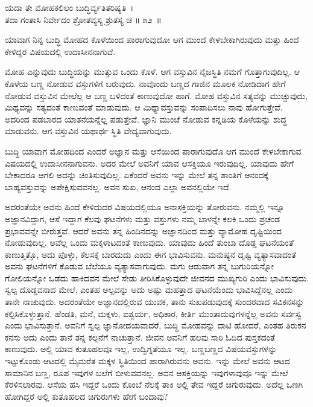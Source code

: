\begin{shloka}
ಯದಾ ತೇ ಮೋಹಕಲಿಲಂ ಬುದ್ಧಿರ್ವ್ಯತಿತರಿಷ್ಯತಿ~।\\ತದಾ ಗಂತಾಸಿ ನಿರ್ವೇದಂ ಶ್ರೋತವ್ಯಸ್ಯ ಶ್ರುತಸ್ಯ ಚ \hfill॥ ೫೨~॥
\end{shloka}

\begin{artha}
ಯಾವಾಗ ನಿನ್ನ ಬುದ್ಧಿ ಮೋಹದ ಕೊಳೆಯಿಂದ ಪಾರಾಗುವುದೋ ಆಗ ಮುಂದೆ ಕೇಳಬೇಕಾಗಿರುವುದು ಮತ್ತು ಹಿಂದೆ ಕೇಳಿದ್ದರ ವಿಷಯದಲ್ಲಿ ಉದಾಸೀನನಾಗುವೆ.
\end{artha}

ಮೋಹ ಎನ್ನುವುದು ಬುದ್ಧಿಯನ್ನು ಮುತ್ತುವ ಒಂದು ಕೊಳೆ. ಆಗ ವಸ್ತುವಿನ ನೈಜಸ್ಥಿತಿ ನಮಗೆ ಗೊತ್ತಾಗುವುದಿಲ್ಲ. ಆ ಕೊಳೆಯ ಬಣ್ಣ ನೋಡುವ ವಸ್ತುಗಳಿಗೆ ಬರುವುದು. ನಾವೊಂದು ಬಣ್ಣದ ಗಾಜಿನ ಮೂಲಕ ನೋಡಿದಾಗ ಹೇಗೆ ನೋಡುವ ವಸ್ತುವಿನ ಮೇಲೆಲ್ಲ ಆ ಬಣ್ಣ ಬಳಿದಂತೆ ಕಾಣುವುದೋ ಹಾಗೆ. ಮೋಹ ವಸ್ತುವಿನ ಸತ್ಯವನ್ನು ಮುಚ್ಚುವುದು, ಮಿಥ್ಯವನ್ನು ಸತ್ಯದಂತೆ ಕಾಣುವಂತೆ ಮಾಡುವುದು. ಆ ಮಿಥ್ಯಾವಸ್ತುವನ್ನು ಸಂಪಾದಿಸಲು ನಾವು ಹೋಗುತ್ತೇವೆ. ಅದರಿಂದ ಪಡಬಾರದ ಯಾತನೆಯನ್ನೆಲ್ಲ ಪಡುತ್ತೇವೆ. ಜ್ಞಾನಿ ಮುಂಚೆ ನೋಡುವ ಕನ್ನಡಿಯ ಕೊಳೆಯನ್ನು ಶುದ್ಧ ಮಾಡುವನು. ಆಗ ವಸ್ತುವಿನ ಯಥಾರ್ಥ ಸ್ಥಿತಿ ವೇದ್ಯವಾಗುವುದು.

ಬುದ್ಧಿ ಯಾವಾಗ ಮೋಹದಿಂದ ಎಂದರೆ ಅಜ್ಞಾನ ಮತ್ತು ಆಸೆಯಿಂದ ಪಾರಾಗುವುದೊ ಆಗ ಮುಂದೆ ಕೇಳಬೇಕಾಗುವ ವಿಷಯದಲ್ಲಿ ಉದಾಸೀನನಾಗುವನು. ಅದರ ಮೇಲೆ ಅವನಿಗೆ ಯಾವ ಆಸಕ್ತಿಯೂ ಇರುವುದಿಲ್ಲ. ಯಾವುದು ಹೇಗೆ ಬೇಕಾದರೂ ಆಗಲಿ ಅದನ್ನು ಚಿಂತಿಸುವುದಿಲ್ಲ. ಏಕೆಂದರೆ ಅವನು ಇನ್ನು ಮೇಲೆ ತನ್ನ ಶಾಂತಿಗೆ ಆನಂದಕ್ಕೆ ಬಾಹ್ಯವಸ್ತುವನ್ನು ಅಪೇಕ್ಷಿಸುವವನಲ್ಲ. ಅವನ ಸುಖ, ಆನಂದ ಎಲ್ಲಾ ಅವನಲ್ಲಿಯೇ ಇದೆ.

ಅದರಂತೆಯೇ ಅವನು ಹಿಂದೆ ಕೇಳಿದುದರ ವಿಷಯದಲ್ಲಿಯೂ ಅನಾಸಕ್ತಿಯನ್ನು ತೋರು\-ವನು. ನಮ್ಮಲ್ಲಿ ಇನ್ನೂ ಅಜ್ಞಾನವಿದ್ದಾಗ, ಆಸೆ ಇದ್ದಾಗ ಕೆಲವು ಘಟನೆಗಳು ಮತ್ತು ವಸ್ತುಗಳು ನಮ್ಮ ಬಾಳನ್ನೇ ಕಲಕಿ ಒಂದು ಪ್ರಚಂಡ ಪ್ರಭಾವವನ್ನೇ ಬೀರುತ್ತವೆ. ಆದರೆ ಅವನು ತನ್ನ ಹಿಂದಿನದನ್ನು ಅಜ್ಞಾನದಿಂದ ಮತ್ತು ವ್ಯಾಮೋಹ ದೃಷ್ಟಿಯಿಂದ ನೋಡುವುದಿಲ್ಲ. ಅವೆಲ್ಲ ಒಂದು ಮಕ್ಕಳಾಟದಂತೆ ಕಾಣುವುದು. ಯಾವುದು ಹಿಂದೆ ತುಂಬಾ ದೊಡ್ಡ ಘಟನೆಯಂತೆ ಕಾಣುತ್ತಿತ್ತೊ, ಅದು ಪೊಳ್ಳು, ಕೆಲಸಕ್ಕೆ ಬಾರದುದು ಎಂದು ಈಗ ಭಾವಿಸುವನು. ಮನುಷ್ಯನ ದೃಷ್ಟಿ ವ್ಯತ್ಯಾಸ\-ವಾದಂತೆ ಅವನು ಘಟನೆಗಳಿಗೆ ಕೊಡುವ ಬೆಲೆಯೂ ವ್ಯತ್ಯಾಸವಾಗುವುದು. ಮಗು ಆಡುವಾಗ ತನ್ನ ಬುಗುರಿಯನ್ನೋ ಗೋಲಿಯನ್ನೋ ಒಡೆದು ಹಾಕಿದವನ ಮೇಲೆ ಸೇಡು ತೀರಿಸಿಕೊಳ್ಳುವುದೇ ಜೀವನದ ಮುಖ್ಯಗುರಿ ಎಂದು ಭಾವಿಸುವುದು. ಸ್ವಲ್ಪ ದೊಡ್ಡವನಾದ ಮೇಲೆ, ಎಂತಹ ಅಲ್ಪವನ್ನು ಅದು ಅಷ್ಟು ಮಹತ್ತಾದ ಘಟನೆಯೆಂದು ಭಾವಿಸಿದ್ದೆನಲ್ಲ ಎಂದು ತಾನೇ ನಾಚುವುದು. ಅದರಂತೆಯೇ ಅಜ್ಞಾನದಲ್ಲಿರುವ ಯುವಕ, ತಾನು ಸುಖಪಡುವುದಕ್ಕೆ ಸುಂದರವಾದ ಸವಿಕನಸನ್ನು ಕಲ್ಪಿಸಿಕೊಳ್ಳುತ್ತಾನೆ. ಹೆಂಡತಿ, ಮನೆ, ಮಕ್ಕಳು, ಐಶ್ವರ್ಯ, ಅಧಿಕಾರ, ಕೀರ್ತಿ ಮುಂತಾದುವುಗಳನ್ನೆಲ್ಲ ಅವನು ಸರ್ವಸ್ವ ಎಂದು ಭಾವಿಸುತ್ತಾನೆ. ಅವನಿಗೆ ಸ್ವಲ್ಪ ಜ್ಞಾನೋದಯವಾದರೆ, ಬುದ್ಧಿ ಮೋಹವನ್ನು ದಾಟಿ ಹೋದರೆ, ಎಂತಹ ತಿರುಕನ ಕನಸು ಅದು ಎಂದು ತಾನೆ ತನ್ನ ಕಲ್ಪನೆಗೆ ನಾಚುತ್ತಾನೆ. ಜೀವನ ಅವನಿಗೆ ಹಲವು ಸಾರಿ ಓದಿದ ಪುಸ್ತಕದಂತೆ ಕಾಣುವುದು. ಅಲ್ಲಿ ಯಾವ ಕುತೂಹಲವೂ ಇಲ್ಲ, ಉದ್ವಿಗ್ನತೆಯೂ ಇಲ್ಲ. ಬಣ್ಣಬಣ್ಣದ ವಿಷಯವಸ್ತುಗಳನ್ನು ಇಟ್ಟುಕೊಂಡು ಆಟದಲ್ಲಿ ಮೈಮರೆತ ಮಕ್ಕಳ ಸ್ಥಿತಿಯಿಂದ ಪಾರಾಗಿರುವನು ಅವನು. ಇನ್ನು ಮೇಲೆ ಅವನು ಆಟದ ಸಾಮಾನಿನ ಬಣ್ಣ, ರೂಪ ಇವುಗಳ ಬಲೆಗೆ ಬೀಳುವವನಲ್ಲ. ಅವನ ಆಸಕ್ತಿಯನ್ನು ಇವುಗಳಾವುವೂ ಇನ್ನು ಮೇಲೆ ಕೆರಳಿಸಲಾರವು. ಆಸೆಯ ಹಸಿ ಇದ್ದರೆ ಒಂದು ಕೊಂಬೆ ನೆಲಕ್ಕೆ ತಾಕಿ ಅಲ್ಲಿ ತೇವ ಇದ್ದರೆ ಚಿಗುರುವುದು. ಅದೆಲ್ಲ ಒಣಗಿ ಹೋಗಿದ್ದರೆ ಅಲ್ಲಿ ಕುತೂಹಲದ ಚಿಗುರುಗಳು ಹೇಗೆ ಬಂದಾವು?


